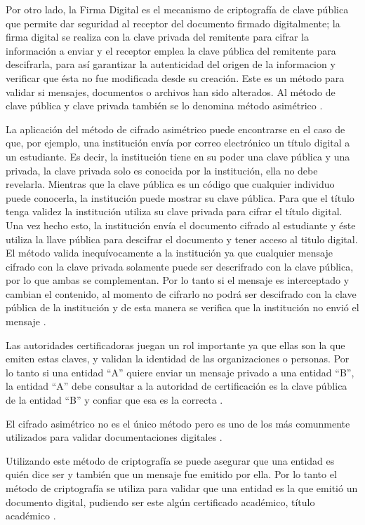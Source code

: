 Por otro lado, la Firma Digital es el mecanismo de criptografía de clave pública que permite dar
seguridad al receptor del documento firmado digitalmente; la firma digital se realiza con la
clave privada del remitente para cifrar la información a enviar y el receptor emplea la
clave pública del remitente para descifrarla, para así garantizar la autenticidad del origen de la informacion y verificar 
que ésta no fue modificada desde su creación. Este es un método para validar si mensajes, documentos o archivos han sido alterados.
Al método de clave pública y clave privada también se lo denomina método asimétrico \cite[]{avila_implementacion_2015}.


La aplicación del método de cifrado asimétrico puede encontrarse en el caso de que, por ejemplo,  una institución envía por correo electrónico un título digital a un estudiante. Es decir, 
la institución tiene en su poder
una clave pública y una privada,
la clave privada solo es conocida por la institución, ella no debe revelarla. Mientras
que la clave pública es un código que cualquier individuo puede conocerla, la institución puede 
mostrar su clave pública.
Para que el título tenga validez la institución utiliza su clave privada para cifrar el título digital. Una vez hecho esto, la institución envía el documento cifrado al estudiante y éste utiliza la llave pública para descifrar el documento y tener acceso al titulo digital.
El método valida inequívocamente a la institución ya que cualquier mensaje cifrado con la clave privada solamente puede ser descrifrado con la clave pública, por lo que ambas se complementan.
Por lo tanto si el mensaje es interceptado y cambian el  contenido, al momento de cifrarlo 
no podrá ser descifrado con la clave pública de la institución y de esta manera se verifica que la institución no envió el mensaje \cite[]{avila_implementacion_2015,garcia_rojas_implementacion_2008,avanzaexportador_certificados_2009}. 


Las autoridades certificadoras juegan un rol importante ya que ellas son la que emiten estas claves,
y validan la identidad de las organizaciones o personas. Por lo tanto si una entidad “A” quiere enviar un mensaje
privado a una entidad “B”, la entidad “A” debe consultar a la autoridad de certificación  es la clave pública de 
la entidad “B” y confiar que esa es la correcta \cite[]{garcia_rojas_implementacion_2008}. 

El cifrado asimétrico no es el único método pero es uno de los más comunmente utilizados para validar documentaciones digitales \cite[]{crypto_sheinix_bitcoin_2020}.  

Utilizando este método de criptografía se puede asegurar que una entidad es quién dice ser y también que un mensaje fue
emitido por ella. Por lo tanto el método de criptografía se utiliza para validar que una entidad es la que emitió un documento digital,
pudiendo ser este algún certificado académico,  título  académico \cite[]{avila_implementacion_2015,garcia_rojas_implementacion_2008,crypto_sheinix_bitcoin_2020}. 







  

